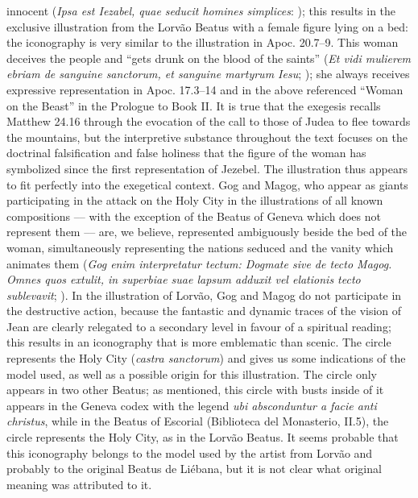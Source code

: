 \documentclass{article}
\begin{document}
innocent (\emph{Ipsa est Iezabel, quae seducit homines simplices}: \citealt[224]{gonzalez_echegaray_obras_1995}); this results in the exclusive
illustration from the Lorvão Beatus with a female figure lying on a bed:
the iconography is very similar to the illustration in Apoc. 20.7--9.
This woman deceives the people and ``gets drunk on the blood of the
saints'' (\emph{Et vidi mulierem ebriam de sanguine sanctorum, et
sanguine martyrum Iesu}; \citealt[568]{gonzalez_echegaray_obras_1995}); she
always receives expressive representation in Apoc. 17.3--14 and in the
above referenced ``Woman on the Beast'' in the Prologue to Book II. It
is true that the exegesis recalls Matthew 24.16 through the evocation of
the call to those of Judea to flee towards the mountains, but the interpretive substance
throughout the text focuses on the doctrinal falsification and false
holiness that the figure of the woman has symbolized since the first
representation of Jezebel. The illustration thus appears to fit
perfectly into the exegetical context. Gog and Magog, who appear as
giants participating in the attack on the Holy City in the illustrations
of all known compositions –– with the exception of the Beatus of Geneva
which does not represent them –– are, we believe, represented
ambiguously beside the bed of the woman, simultaneously representing the
nations seduced and the vanity which animates them (\emph{Gog enim
interpretatur tectum: Dogmate sive de tecto Magog. Omnes quos extulit,
in superbiae suae lapsum adduxit vel elationis tecto sublevavit}; \citealt[620]{gonzalez_echegaray_obras_1995}). In the illustration of Lorvão, Gog
and Magog do not participate in the destructive action, because the
fantastic and dynamic traces of the vision of Jean are clearly relegated
to a secondary level in favour of a spiritual reading; this results in
an iconography that is more emblematic than scenic. The circle
represents the Holy City (\emph{castra sanctorum}) and gives us some
indications of the model used, as well as a possible origin for this
illustration. The circle only appears in two other Beatus; as mentioned,
this circle with busts inside of it appears in the Geneva codex with the
legend \emph{ubi absconduntur a facie anti christus}, while in the
Beatus of Escorial (Biblioteca del Monasterio, II.5), the circle
represents the Holy City, as in the Lorvão Beatus. It seems probable that
this iconography belongs to the model used by the artist from Lorvão and
probably to the original Beatus de Liébana, but it is not clear what
original meaning was attributed to it.
\end{document}
